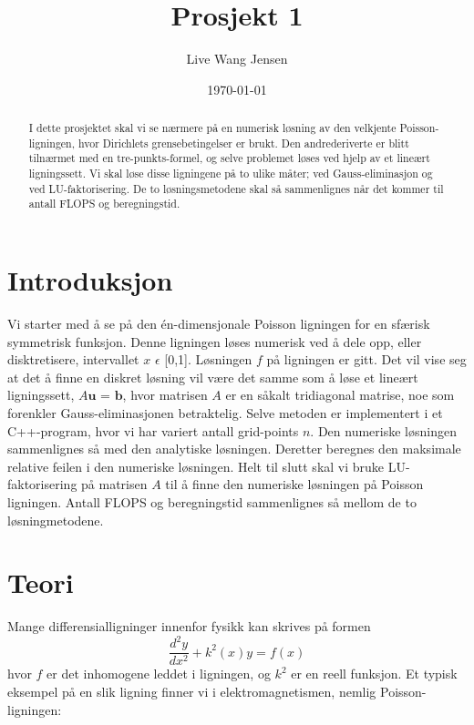 \documentclass{article}
\title{Prosjekt 1}
\author{Live Wang Jensen}
\date{\today}
\begin{document}
\maketitle


\begin{abstract}
I dette prosjektet skal vi se nærmere på en numerisk løsning av den velkjente Poisson-ligningen, hvor Dirichlets grensebetingelser er brukt. Den andrederiverte er blitt tilnærmet med en tre-punkts-formel, og selve problemet løses ved hjelp av et lineært ligningssett. Vi skal løse disse ligningene på to ulike måter; ved Gauss-eliminasjon og ved LU-faktorisering. De to løsningsmetodene skal så sammenlignes når det kommer til antall FLOPS og beregningstid.

\end{abstract}

\section{Introduksjon}
Vi starter med å se på den én-dimensjonale Poisson ligningen for en sfærisk symmetrisk funksjon. Denne ligningen løses numerisk ved å dele opp, eller disktretisere, intervallet $x$ $\epsilon$ [0,1]. Løsningen $f$ på ligningen er gitt. Det vil vise seg at det å finne en diskret løsning vil være det samme som å løse et lineært ligningssett, $A\textbf{u}$ = $\textbf{\~b}$, hvor matrisen $A$ er en såkalt tridiagonal matrise, noe som forenkler Gauss-eliminasjonen betraktelig. Selve metoden er implementert i et C++-program, hvor vi har variert antall grid-points $n$. Den numeriske løsningen sammenlignes så med den analytiske løsningen. Deretter beregnes den maksimale relative feilen i den numeriske løsningen. Helt til slutt skal vi bruke LU-faktorisering på matrisen $A$ til å finne den numeriske løsningen på Poisson ligningen. Antall FLOPS og beregningstid sammenlignes så mellom de to løsningmetodene.

\section{Teori}
Mange differensialligninger innenfor fysikk kan skrives på formen
\begin{equation}
\frac{d^2y}{dx^2} + k^2(x)y = f(x)
\end{equation}
hvor $f$ er det inhomogene leddet i ligningen, og $k^2$ er en reell funksjon. Et typisk eksempel på en slik ligning finner vi i elektromagnetismen, nemlig Poisson-ligningen:
\end{document}
